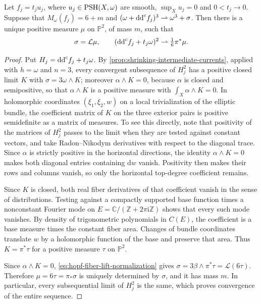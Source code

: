\begin{lemma}\label{lem:hopf-defect-fiber-necessity}
Let $f_j=t_ju_j$, where $u_j\in\mathrm{PSH}(X,\omega)$ are smooth, $\sup_Xu_j=0$ and $0<t_j\to0$. Suppose that $M_\omega(f_j)=6+m$ and $(\omega+\mathrm{dd}^{\mathrm{c}} f_j)^3\rightharpoonup\omega^3+\sigma$. Then there is a unique positive measure $\mu$ on $\mathbb P^2$, of mass $m$, such that
\[
 \sigma=\mathcal L\mu,\qquad
 (\mathrm{dd}^{\mathrm{c}} f_j+t_j\omega)^2\rightharpoonup\tfrac16\pi^*\mu.
\]
\end{lemma}
\begin{proof}
Put $H_j=\mathrm{dd}^{\mathrm{c}} f_j+t_j\omega$. By \cref{prop:shrinking-intermediate-currents}, applied with $h=\omega$ and $n=3$, every convergent subsequence of $H_j^2$ has a positive closed limit $K$ with $\sigma=3\omega\wedge K$; moreover $\alpha\wedge K=0$, because $\alpha$ is closed and semipositive, so that $\alpha\wedge K$ is a positive measure with $\int_X\alpha\wedge K=0$. In holomorphic coordinates $(\xi_1,\xi_2,w)$ on a local trivialization of the elliptic bundle, the coefficient matrix of $K$ on the three exterior pairs is positive semidefinite as a matrix of measures. To see this directly, note that positivity of the matrices of $H_j^2$ passes to the limit when they are tested against constant vectors, and take Radon--Nikodym derivatives with respect to the diagonal trace. Since $\alpha$ is strictly positive in the horizontal directions, the identity $\alpha\wedge K=0$ makes both diagonal entries containing $\mathrm{d}w$ vanish. Positivity then makes their rows and columns vanish, so only the horizontal top-degree coefficient remains.

Since $K$ is closed, both real fiber derivatives of that coefficient vanish in the sense of distributions. Testing against a compactly supported base function times a nonconstant Fourier mode on $E=\mathbb C/(\mathbb Z+2\pi\mathrm{i}\mathbb Z)$ shows that every such mode vanishes. By density of trigonometric polynomials in $C(E)$, the coefficient is a base measure times the constant fiber area. Changes of bundle coordinates translate $w$ by a holomorphic function of the base and preserve that area. Thus $K=\pi^*\tau$ for a positive measure $\tau$ on $\mathbb P^2$.

Since $\alpha\wedge K=0$, \eqref{eq:hopf-fiber-lift-normalization} gives $\sigma=3\beta\wedge\pi^*\tau=\mathcal L(6\tau)$. Therefore $\mu=6\tau=\pi_*\sigma$ is uniquely determined by $\sigma$, and it has mass $m$. In particular, every subsequential limit of $H_j^2$ is the same, which proves convergence of the entire sequence.
\end{proof}

